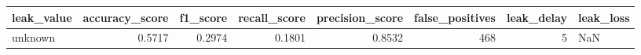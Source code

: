 \begin{tabular}{lrrrrrrl}
\toprule
leak\_value & accuracy\_score & f1\_score & recall\_score & precision\_score & false\_positives & leak\_delay & leak\_loss \\
\midrule
unknown & 0.5717 & 0.2974 & 0.1801 & 0.8532 & 468 & 5 & NaN \\
\bottomrule
\end{tabular}
